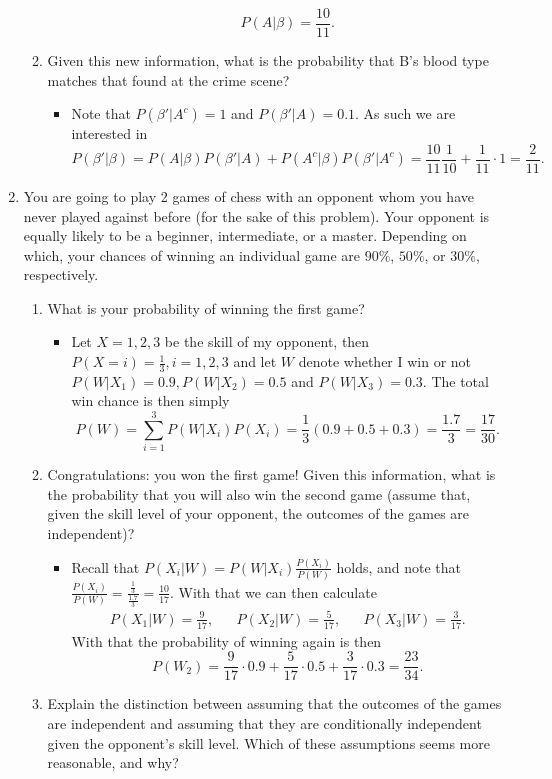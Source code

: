 \documentclass{article}
\begin{document}
\begin{enumerate}
\begin{enumerate}
\begin{itemize}
					$$
					P(A|\beta) = \frac{10}{11}.
					$$
				\end{itemize}
			\item Given this new information, what is the probability that B’s blood type matches that found at the crime scene?
				\begin{itemize}
					\item Note that $P(\beta'|A^c) = 1$ and $P(\beta'|A) = 0.1$. As such we are interested in
					$$
					P(\beta'|\beta) = P(A|\beta)P(\beta'|A) + P(A^c|\beta)P(\beta'|A^c) = \frac{10}{11} \frac{1}{10} + \frac{1}{11} \cdot 1 = \frac{2}{11}.
					$$
				\end{itemize}
		\end{enumerate}
	\item You are going to play 2 games of chess with an opponent whom you have never played against before (for the sake of this problem). Your opponent is equally likely to be a beginner, intermediate, or a master. Depending on which, your chances of winning an individual game are $90\%$, $50\%$, or $30\%$, respectively.
		\begin{enumerate}
			\item What is your probability of winning the first game?
				\begin{itemize}
					\item Let $X = 1, 2, 3$ be the skill of my opponent, then $P(X = i) = \frac{1}{3}, i = 1, 2, 3$ and let $W$ denote whether I win or not $P(W|X_1) = 0.9, P(W|X_2) = 0.5$ and $P(W|X_3) = 0.3$. The total win chance is then simply
					$$
					P(W) = \sum_{i = 1}^3 P(W|X_i)P(X_i) = \frac{1}{3} \left(0.9 + 0.5 + 0.3 \right) = \frac{1.7}{3} = \frac{17}{30}.
					$$
				\end{itemize}
			\item Congratulations: you won the first game! Given this information, what is the probability that you will also win the second game (assume that, given the skill level of your opponent, the outcomes of the games are independent)?
				\begin{itemize}
					\item Recall that $P(X_i|W) = P(W|X_i) \frac{P(X_i)}{P(W)}$ holds, and note that $\frac{P(X_i)}{P(W)} = \frac{\frac{1}{3}}{\frac{1.7}{3}} = \frac{10}{17}$. With that we can then calculate
					$$
					\begin{aligned}
					P(X_1|W) = \frac{9}{17},&&P(X_2|W) = \frac{5}{17},&&P(X_3|W) = \frac{3}{17}.
					\end{aligned}
					$$
					With that the probability of winning again is then
					$$
					P(W_2) = \frac{9}{17} \cdot 0.9 + \frac{5}{17} \cdot 0.5 + \frac{3}{17} \cdot 0.3 = \frac{23}{34}.
 					$$
				\end{itemize}
			\item Explain the distinction between assuming that the outcomes of the games are independent and assuming that they are conditionally independent given the opponent’s skill level. Which of these assumptions seems more reasonable, and why?
		\end{enumerate}
\end{enumerate}
\end{document}
